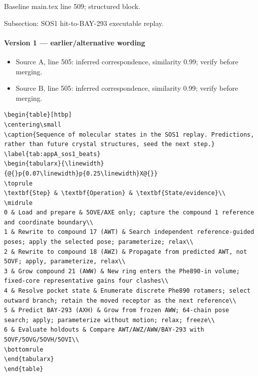 \documentclass[11pt]{article}
\begin{document}
Baseline main.tex line 509; structured block.

Subsection: SOS1 hit-to-BAY-293 executable replay.

\paragraph{Version 1 --- earlier/alternative wording}

\begin{itemize}[leftmargin=*]
\item Source A, line 505: inferred correspondence, similarity 0.99; verify before merging.
\item Source B, line 505: inferred correspondence, similarity 0.99; verify before merging.
\end{itemize}

\begin{lstlisting}
\begin{table}[htbp]
\centering\small
\caption{Sequence of molecular states in the SOS1 replay. Predictions, rather than future crystal structures, seed the next step.}
\label{tab:appA_sos1_beats}
\begin{tabularx}{\linewidth}{@{}p{0.07\linewidth}p{0.25\linewidth}X@{}}
\toprule
\textbf{Step} & \textbf{Operation} & \textbf{State/evidence}\\
\midrule
0 & Load and prepare & 5OVE/AXE only; capture the compound 1 reference and coordinate boundary\\
1 & Rewrite to compound 17 (AWT) & Search independent reference-guided poses; apply the selected pose; parameterize; relax\\
2 & Rewrite to compound 18 (AWZ) & Propagate from predicted AWT, not 5OVF; apply, parameterize, relax\\
3 & Grow compound 21 (AWW) & New ring enters the Phe890-in volume; fixed-core representative gains four clashes\\
4 & Resolve pocket state & Enumerate discrete Phe890 rotamers; select outward branch; retain the moved receptor as the next reference\\
5 & Predict BAY-293 (AXH) & Grow from frozen AWW; 64-chain pose search; apply; parameterize without motion; relax; freeze\\
6 & Evaluate holdouts & Compare AWT/AWZ/AWW/BAY-293 with 5OVF/5OVG/5OVH/5OVI\\
\bottomrule
\end{tabularx}
\end{table}
\end{lstlisting}
\end{document}

